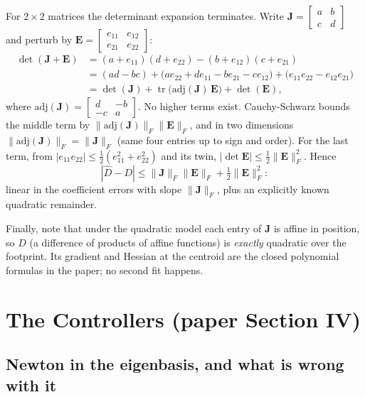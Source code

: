 \documentclass[11pt]{article}
\begin{document}
For $2\times2$ matrices the determinant expansion terminates. Write
$\mathbf{J} = \begin{bmatrix} a & b \\ c & d \end{bmatrix}$ and perturb by
$\mathbf{E} = \begin{bmatrix} e_{11} & e_{12} \\ e_{21} & e_{22}
\end{bmatrix}$:
\begin{align}
\det(\mathbf{J} + \mathbf{E})
&= (a + e_{11})(d + e_{22}) - (b + e_{12})(c + e_{21}) \\
&= (ad - bc) + \bigl(a e_{22} + d e_{11} - b e_{21} - c e_{12}\bigr)
 + \bigl(e_{11}e_{22} - e_{12}e_{21}\bigr) \\
&= \det(\mathbf{J})
 + \operatorname{tr}\!\bigl(\mathrm{adj}(\mathbf{J})\,\mathbf{E}\bigr)
 + \det(\mathbf{E}),
\end{align}
where $\mathrm{adj}(\mathbf{J}) = \begin{bmatrix} d & -b \\ -c & a
\end{bmatrix}$. No higher terms exist. Cauchy-Schwarz bounds the middle
term by $\|\mathrm{adj}(\mathbf{J})\|_F\|\mathbf{E}\|_F$, and in two
dimensions $\|\mathrm{adj}(\mathbf{J})\|_F = \|\mathbf{J}\|_F$ (same four
entries up to sign and order). For the last term, from
$|e_{11}e_{22}| \leq \tfrac{1}{2}(e_{11}^2 + e_{22}^2)$ and its twin,
$|\det \mathbf{E}| \leq \tfrac{1}{2}\|\mathbf{E}\|_F^2$. Hence
\begin{equation}
|\hat{D} - D| \leq \|\mathbf{J}\|_F\|\mathbf{E}\|_F
+ \tfrac{1}{2}\|\mathbf{E}\|_F^2 :
\end{equation}
linear in the coefficient errors with slope $\|\mathbf{J}\|_F$, plus an
explicitly known quadratic remainder.

Finally, note that under the quadratic model each entry of $\mathbf{J}$ is
affine in position, so $D$ (a difference of products of affine functions)
is \emph{exactly} quadratic over the footprint. Its gradient and Hessian at
the centroid are the closed polynomial formulas in the paper; no second fit
happens.

\section{The Controllers (paper Section IV)}

\subsection{Newton in the eigenbasis, and what is wrong with it}
\end{document}
